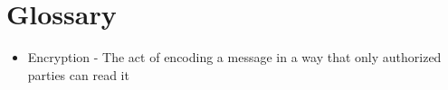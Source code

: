 
\section{Glossary}

\begin{itemize}
\item{Encryption - The act of encoding a message in a way that only authorized parties can read it}
\end{itemize}